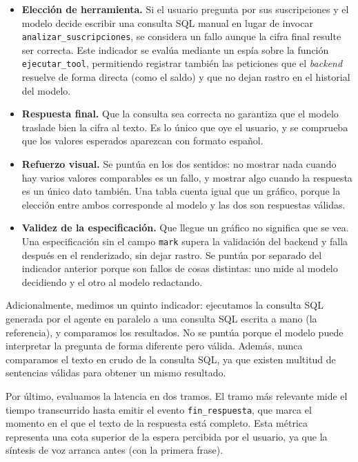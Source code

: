 \begin{itemize}
    \item \textbf{Elección de herramienta.} Si el usuario pregunta por sus 
    suscripciones y el modelo decide escribir una consulta SQL manual en lugar 
    de invocar \texttt{analizar\_suscripciones}, se considera un fallo aunque 
    la cifra final resulte ser correcta. Este indicador se evalúa mediante un 
    espía sobre la función \texttt{ejecutar\_tool}, permitiendo registrar 
    también las peticiones que el \emph{backend} resuelve de forma directa 
    (como el saldo) y que no dejan rastro en el historial del modelo.

    \item \textbf{Respuesta final.} Que la consulta sea correcta no garantiza
    que el modelo traslade bien la cifra al texto. Es lo único que oye el
    usuario, y se comprueba que los valores esperados aparezcan con formato
    español.

    \item \textbf{Refuerzo visual.} Se puntúa en los dos sentidos: no mostrar
    nada cuando hay varios valores comparables es un fallo, y mostrar algo
    cuando la respuesta es un único dato también. Una tabla cuenta igual que un
    gráfico, porque la elección entre ambos corresponde al modelo y las dos son
    respuestas válidas.

    \item \textbf{Validez de la especificación.} Que llegue un gráfico no
    significa que se vea. Una especificación sin el campo \texttt{mark} supera
    la validación del backend y falla después en el renderizado, sin dejar
    rastro. Se puntúa por separado del indicador anterior porque son fallos de
    cosas distintas: uno mide al modelo decidiendo y el otro al modelo
    redactando.
\end{itemize}

Adicionalmente, medimos un quinto indicador: ejecutamos la consulta SQL generada por el agente en paralelo a 
una consulta SQL escrita a mano (la referencia), y comparamos los resultados. 
No se puntúa porque el modelo puede interpretar la pregunta de forma diferente 
pero válida. Además, nunca comparamos el texto en crudo de la consulta SQL, 
ya que existen multitud de sentencias válidas para obtener un mismo resultado.

Por último, evaluamos la latencia en dos tramos. El tramo más relevante mide 
el tiempo transcurrido hasta emitir el evento \texttt{fin\_respuesta}, que marca 
el momento en el que el texto de la respuesta está completo. Esta métrica 
representa una cota superior de la espera percibida por el usuario, ya que la 
síntesis de voz arranca antes (con la primera frase).

